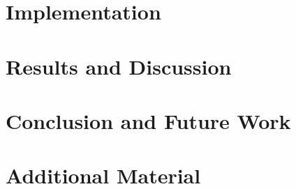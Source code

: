 \documentclass[degree=bs,bib=ieee]{saus-thesis}
\begin{document}
\chapter{Implementation}

\chapter{Results and Discussion}

\chapter{Conclusion and Future Work}

\printreferences

\appendix
\chapter{Additional Material}
\end{document}
